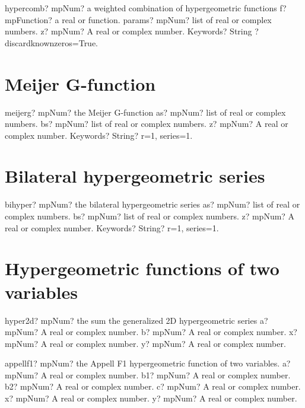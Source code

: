 \documentclass[12pt,a4paper,openany]{book}
\begin{document}
\begin{mpFunctionsExtract}
\mpFunctionFour
{hypercomb? mpNum? a weighted combination of hypergeometric functions}
{f? mpFunction? a real or function.}
{params? mpNum? list of real or complex numbers.}
{z? mpNum? A real or complex number.}
{Keywords? String ? discardknownzeros=True.}
\end{mpFunctionsExtract}

\section{Meijer G-function}

\begin{mpFunctionsExtract}
\mpFunctionFour
{meijerg? mpNum? the  Meijer G-function}
{as? mpNum? list of real or complex numbers.}
{bs? mpNum? list of real or complex numbers.}
{z? mpNum? A real or complex number.}
{Keywords? String?  r=1, series=1.}
\end{mpFunctionsExtract}

\section{Bilateral hypergeometric series}

\begin{mpFunctionsExtract}
\mpFunctionFour
{bihyper? mpNum? the  bilateral hypergeometric series}
{as? mpNum? list of real or complex numbers.}
{bs? mpNum? list of real or complex numbers.}
{z? mpNum? A real or complex number.}
{Keywords? String?  r=1, series=1.}
\end{mpFunctionsExtract}

\section{Hypergeometric functions of two variables}

\begin{mpFunctionsExtract}
\mpFunctionFour
{hyper2d? mpNum? the sum the generalized 2D hypergeometric series}
{a? mpNum? A real or complex number.}
{b? mpNum? A real or complex number.}
{x? mpNum? A real or complex number.}
{y? mpNum? A real or complex number.}
\end{mpFunctionsExtract}

\begin{mpFunctionsExtract}
\mpFunctionSix
{appellf1? mpNum? the Appell F1 hypergeometric function of two variables.}
{a? mpNum? A real or complex number.}
{b1? mpNum? A real or complex number.}
{b2? mpNum? A real or complex number.}
{c? mpNum? A real or complex number.}
{x? mpNum? A real or complex number.}
{y? mpNum? A real or complex number.}
\end{mpFunctionsExtract}
\end{document}
